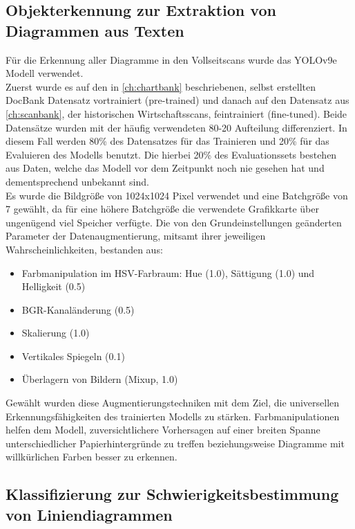 \subsection{Objekterkennung zur Extraktion von Diagrammen aus Texten}
\label{ch:objectdetection}

Für die Erkennung aller Diagramme in den Vollseitscans wurde das YOLOv9e Modell verwendet.
\\
Zuerst wurde es auf den in \ref{ch:chartbank} beschriebenen, selbst erstellten DocBank Datensatz vortrainiert (pre-trained) und danach auf den Datensatz aus \ref{ch:scanbank}, der historischen Wirtschaftsscans, feintrainiert (fine-tuned). Beide Datensätze wurden mit der häufig verwendeten 80-20 Aufteilung differenziert. In diesem Fall werden 80\% des Datensatzes für das Trainieren und 20\% für das Evaluieren des Modells benutzt. Die hierbei 20\% des Evaluationssets bestehen aus Daten, welche das Modell vor dem Zeitpunkt noch nie gesehen hat und dementsprechend unbekannt sind.
\\
Es wurde die Bildgröße von 1024x1024 Pixel verwendet und eine Batchgröße von 7 gewählt, da für eine höhere Batchgröße die verwendete Grafikkarte über ungenügend viel Speicher verfügte. Die von den Grundeinstellungen geänderten Parameter der Datenaugmentierung, mitsamt ihrer jeweiligen Wahrscheinlichkeiten, bestanden aus:

\begin{itemize}[itemsep=0pt, topsep=0pt]
    \item Farbmanipulation im HSV-Farbraum: Hue (1.0), Sättigung (1.0) und Helligkeit (0.5)
    \item BGR-Kanaländerung (0.5)
    \item Skalierung (1.0)
    \item Vertikales Spiegeln (0.1)
    \item Überlagern von Bildern (Mixup, 1.0)
\end{itemize}

Gewählt wurden diese Augmentierungstechniken mit dem Ziel, die universellen Erkennungsfähigkeiten des trainierten Modells zu stärken. Farbmanipulationen helfen dem Modell, zuversichtlichere Vorhersagen auf einer breiten Spanne unterschiedlicher Papierhintergründe zu treffen beziehungsweise Diagramme mit willkürlichen Farben besser zu erkennen.

\clearpage


\subsection{Klassifizierung zur Schwierigkeitsbestimmung von Liniendiagrammen}
\label{ch:classify}

